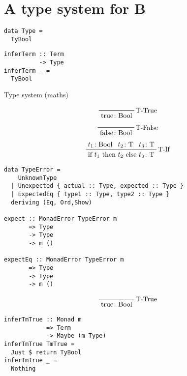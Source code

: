 \documentclass{beamer}
\begin{document}
\section{A type system for B}

\begin{frame}[fragile]
  \begin{verbatim}
data Type =
  TyBool
  \end{verbatim}
\end{frame}

\begin{frame}[fragile]
  \begin{verbatim}
inferTerm :: Term 
          -> Type
inferTerm _ =
  TyBool
  \end{verbatim}
\end{frame}

\begin{frame}[c]
  \begin{center}
Type system (maths)
  \end{center}
  \begin{displaymath}
    \prftree[r]{T-True}
    {\text{true} \colon \text{Bool}}
  \end{displaymath}
  \begin{displaymath}
    \prftree[r]{T-False}
    {\text{false} \colon \text{Bool}}
  \end{displaymath}
  \begin{displaymath}
    \prftree[r]{T-If}
    {t_1 \colon \text{Bool}}
    {t_2 \colon \text{T}}
    {t_3 \colon \text{T}}
    {\text{if $t_1$ then $t_2$ else $t_3$} \colon \text{T}}
  \end{displaymath}
\end{frame}

\begin{frame}[fragile]
  \begin{verbatim}
data TypeError =
    UnknownType
  | Unexpected { actual :: Type, expected :: Type }
  | ExpectedEq { type1 :: Type, type2 :: Type }
  deriving (Eq, Ord,Show)

expect :: MonadError TypeError m 
       => Type 
       -> Type 
       -> m ()

expectEq :: MonadError TypeError m 
       => Type 
       -> Type 
       -> m ()
  \end{verbatim}
\end{frame}

\begin{frame}[fragile]
  \begin{displaymath}
    \prftree[r]{T-True}
    {\text{true} \colon \text{Bool}}
  \end{displaymath}
  \begin{verbatim}
inferTmTrue :: Monad m 
            => Term 
            -> Maybe (m Type)
inferTmTrue TmTrue =
  Just $ return TyBool
inferTmTrue _ =
  Nothing
  \end{verbatim}
\end{frame}
\end{document}
